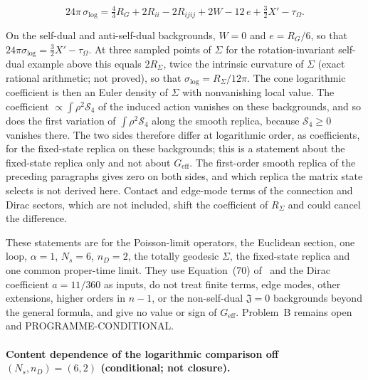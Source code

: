 \[

  24\pi\,\sigma_{\log}=\tfrac43R_G+2R_{ii}-2R_{ijij}+2W-12\,e+\tfrac32X'-\tau_\Omega .

\]

On the self-dual and anti-self-dual backgrounds, \(W=0\) and \(e=R_G/6\), so that \(24\pi\sigma_{\log}=\tfrac32X'-\tau_\Omega\). At three sampled points of \(\Sigma\) for the rotation-invariant self-dual example above this equals \(2R_\Sigma\), twice the intrinsic curvature of \(\Sigma\) (exact rational arithmetic; not proved), so that \(\sigma_{\log}=R_\Sigma/12\pi\). The cone logarithmic coefficient is then an Euler density of \(\Sigma\) with nonvanishing local value. The coefficient \(\propto\int\rho^2\mathcal S_4\) of the induced action vanishes on these backgrounds, and so does the first variation of \(\int\rho^2\mathcal S_4\) along the smooth replica, because \(\mathcal S_4\ge0\) vanishes there. The two sides therefore differ at logarithmic order, as coefficients, for the fixed-state replica on these backgrounds; this is a statement about the fixed-state replica only and not about \(G_{\mathrm{eff}}\). The first-order smooth replica of the preceding paragraphs gives zero on both sides, and which replica the matrix state selects is not derived here. Contact and edge-mode terms of the connection and Dirac sectors, which are not included, shift the coefficient of \(R_\Sigma\) and could cancel the difference.



These statements are for the Poisson-limit operators, the Euclidean section, one loop, \(\alpha=1\), \(N_s=6\), \(n_D=2\), the totally geodesic \(\Sigma\), the fixed-state replica and one common proper-time limit. They use Equation~(70) of~\cite{Solodukhin2011} and the Dirac coefficient \(a=11/360\) as inputs, do not treat finite terms, edge modes, other extensions, higher orders in \(n-1\), or the non-self-dual \(\mathfrak J=0\) backgrounds beyond the general formula, and give no value or sign of \(G_{\mathrm{eff}}\). Problem~B remains open and PROGRAMME-CONDITIONAL.





\paragraph{Content dependence of the logarithmic comparison off \((N_s,n_D)=(6,2)\) (conditional; not closure).} \label{detail:sec-B-paragraphcontentdependenceofth-8}

